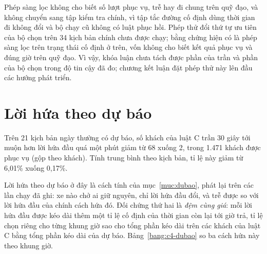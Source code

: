 Phép sàng lọc không cho biết số lượt phục vụ, trễ hay đi chung trên quỹ đạo, và không chuyển sang tập kiểm tra
chính, vì tập tắc đường cố định dùng thời gian đi không đổi và bộ chạy cũ không có luật phục hồi. Phép thử đổi thứ
tự ưu tiên của bộ chọn trên 34 kịch bản chính chưa được chạy; bằng chứng hiện có là phép sàng lọc trên trạng thái
cố định ở trên, vốn không cho biết kết quả phục vụ và đúng giờ trên quỹ đạo. Vì vậy, khóa luận chưa tách được phần
của trần và phần của bộ chọn trong độ tin cậy đã đo; chương kết luận đặt phép thử này lên đầu các hướng phát triển.

\section{Lời hứa theo dự báo}
\label{muc:c4-dubao}

Trên 21 kịch bản ngày thường có dự báo, số khách của luật C trần 30 giây tới muộn hơn lời hứa đầu quá một phút
giảm từ 68 xuống 2, trong 1.471 khách được phục vụ (gộp theo khách). Tính trung bình theo kịch bản, tỉ lệ này
giảm từ 6,01\% xuống 0,17\%.

Lời hứa theo dự báo ở đây là cách tính của mục~\ref{muc:dubao}, phát lại trên các lần chạy đã ghi: xe nào chở ai
giữ nguyên, chỉ lời hứa đầu đổi, và trễ được so với lời hứa đầu của chính cách hứa đó. Đối chứng thứ hai là
\emph{đệm cùng giá}: mỗi lời hứa đầu được kéo dài thêm một tỉ lệ cố định của thời gian còn lại tới giờ trả, tỉ lệ
chọn riêng cho từng khung giờ sao cho tổng phần kéo dài trên các khách của luật C bằng tổng phần kéo dài của dự
báo. Bảng~\ref{bang:c4-dubao} so ba cách hứa này theo khung giờ.

